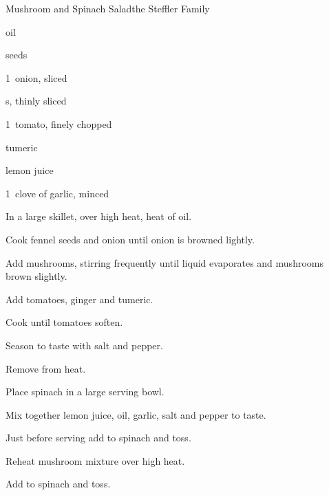 \begin{recipe}{Mushroom and Spinach Salad}{the Steffler Family}{}

\begin{ingredients}
\item {} oil
\item {}  seeds
\item 1~onion, sliced
\item {} s, thinly sliced
\item 1~tomato, finely chopped
\item \tp{\half} 
\item \tp{\quarter} tumeric
\item {} lemon juice
\item 1~clove of garlic, minced
\item {} 
\end{ingredients}

\begin{directions}
\item In a large skillet, over high heat, heat  of oil.
\item Cook fennel seeds and onion until onion is browned lightly.
\item Add mushrooms, stirring frequently until liquid evaporates and mushrooms brown slightly.
\item Add tomatoes, ginger and tumeric.
\item Cook until tomatoes soften.
\item Season to taste with salt and pepper.
\item Remove from heat.
\item Place spinach in a large serving bowl.
\item Mix together lemon juice, oil, garlic, salt and pepper to taste.
\item Just before serving add to spinach and toss.
\item Reheat mushroom mixture over high heat.
\item Add to spinach and toss.
\end{directions}
\end{recipe}
